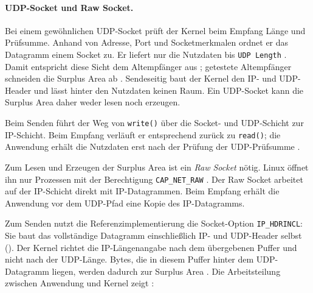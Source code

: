 \paragraph{UDP-Socket und Raw Socket.}
Bei einem gewöhnlichen UDP-Socket prüft der Kernel beim Empfang Länge und Prüfsumme. Anhand von Adresse, Port und
Socketmerkmalen ordnet er das Datagramm einem Socket zu. Er liefert nur die Nutzdaten bis \texttt{UDP Length}
\cite{stephan2024packetpath}. Damit entspricht diese Sicht dem Altempfänger aus ; getestete
Altempfänger schneiden die Surplus Area ab \cite[Sec.~18]{rfc9868}. Sendeseitig baut der Kernel den IP- und UDP-Header
und lässt hinter den Nutzdaten keinen Raum. Ein UDP-Socket kann die Surplus Area daher weder lesen noch erzeugen.

Beim Senden führt der Weg von \texttt{write()} über die Socket- und UDP-Schicht zur IP-Schicht. Beim Empfang verläuft er
entsprechend zurück zu \texttt{read()}; die Anwendung erhält die Nutzdaten erst nach der Prüfung der UDP-Prüfsumme
\cite{linux510udp,stephan2024packetpath}.

Zum Lesen und Erzeugen der Surplus Area ist ein \textit{Raw Socket} nötig. Linux öffnet ihn nur Prozessen mit der
Berechtigung \texttt{CAP\_NET\_RAW} \cite{man7raw}. Der Raw Socket arbeitet auf der IP-Schicht direkt mit
IP-Datagrammen. Beim Empfang erhält die Anwendung vor dem UDP-Pfad eine Kopie des IP-Datagramms.

Zum Senden nutzt die Referenzimplementierung die Socket-Option \texttt{IP\_HDRINCL}: Sie baut das vollständige
Datagramm einschließlich IP- und UDP-Header selbst (). Der Kernel richtet die
IP-Längenangabe nach dem übergebenen Puffer und nicht nach der UDP-Länge. Bytes, die in diesem Puffer hinter
dem UDP-Datagramm liegen, werden dadurch zur Surplus Area \cite{man7raw}.
Die Arbeitsteilung zwischen Anwendung und Kernel zeigt :

